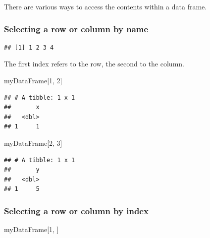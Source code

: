\documentclass[12pt,]{book}
\newenvironment{Shaded}{\begin{snugshade}}{\end{snugshade}}
\newcommand{\DecValTok}[1]{\textcolor[rgb]{0.00,0.00,0.81}{#1}}
\newcommand{\NormalTok}[1]{#1}
\newcommand{\OperatorTok}[1]{\textcolor[rgb]{0.81,0.36,0.00}{\textbf{#1}}}
\begin{document}
There are various ways to access the contents within a data frame.

\hypertarget{selecting-a-row-or-column-by-name}{%
\subsubsection{Selecting a row or column by name}\label{selecting-a-row-or-column-by-name}}

\begin{Shaded}
\end{Shaded}

\begin{verbatim}
## [1] 1 2 3 4
\end{verbatim}

The first index refers to the row, the second to the column.

\begin{Shaded}
\begin{Highlighting}[]
\NormalTok{myDataFrame[}\DecValTok{1}\NormalTok{, }\DecValTok{2}\NormalTok{]}
\end{Highlighting}
\end{Shaded}

\begin{verbatim}
## # A tibble: 1 x 1
##       x
##   <dbl>
## 1     1
\end{verbatim}

\begin{Shaded}
\begin{Highlighting}[]
\NormalTok{myDataFrame[}\DecValTok{2}\NormalTok{, }\DecValTok{3}\NormalTok{]}
\end{Highlighting}
\end{Shaded}

\begin{verbatim}
## # A tibble: 1 x 1
##       y
##   <dbl>
## 1     5
\end{verbatim}

\hypertarget{selecting-a-row-or-column-by-index}{%
\subsubsection{Selecting a row or column by index}\label{selecting-a-row-or-column-by-index}}

\begin{Shaded}
\begin{Highlighting}[]
\NormalTok{myDataFrame[}\DecValTok{1}\NormalTok{, ]}
\end{Highlighting}
\end{Shaded}
\end{document}
